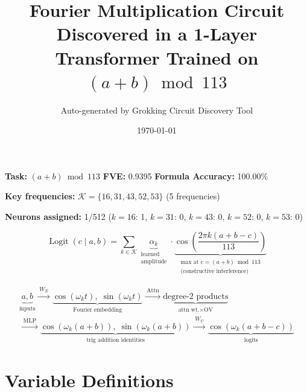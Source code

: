 \documentclass[11pt,a4paper]{article}
\title{Fourier Multiplication Circuit\\[6pt]
\large Discovered in a 1-Layer Transformer Trained on $(a + b) \bmod 113$}
\author{Auto-generated by Grokking Circuit Discovery Tool}
\date{\today}
\newcommand{\MLP}{\operatorname{MLP}}
\newcommand{\attn}{\operatorname{Attn}}
\newcommand{\Logit}{\operatorname{Logit}}
\begin{document}
\maketitle

\begin{tcolorbox}[colback=blue!5!white, colframe=blue!75!black, title=Circuit Summary]
  \textbf{Task:} $(a + b) \bmod 113$ \hfill
  \textbf{FVE:} 0.9395 \hfill
  \textbf{Formula Accuracy:} 100.00\%

  \textbf{Key frequencies:} $\mathcal{K} = \{16, 31, 43, 52, 53\}$
  \quad (5 frequencies)

  \textbf{Neurons assigned:} 1/512
  \quad ($k=16$: 1, $k=31$: 0, $k=43$: 0, $k=52$: 0, $k=53$: 0)
\end{tcolorbox}

\begin{tcolorbox}[colback=green!5!white, colframe=green!75!black, title=The Core Equation]
  \begin{equation}
    \boxed{
      \Logit(c \mid a, b) =
      \sum_{k \in \mathcal{K}}
      \underbrace{\alpha_k}_{\substack{\text{learned} \\ \text{amplitude}}}
      \cdot \underbrace{\cos\!\left(\frac{2\pi k (a + b - c)}{113}\right)}_{\substack{\text{max at } c = (a+b) \bmod 113 \\ \text{(constructive interference)}}}
    }
  \end{equation}
\end{tcolorbox}

\begin{tcolorbox}[colback=orange!5!white, colframe=orange!75!black, title=Data Flow Pipeline]
  \begin{gather*}
    \underbrace{a, b}_{\text{inputs}}
    \xrightarrow{\; W_E \;}
    \underbrace{\cos(\omega_k t),\; \sin(\omega_k t)}_{\text{Fourier embedding}}
    \xrightarrow{\; \attn \;}
    \underbrace{\text{degree-2 products}}_{\substack{\text{attn wt.} \times \text{OV}}} \\[8pt]
    \xrightarrow{\; \MLP \;}
    \underbrace{\cos(\omega_k(a{+}b)),\; \sin(\omega_k(a{+}b))}_{\text{trig addition identities}}
    \xrightarrow{\; W_U \;}
    \underbrace{\cos(\omega_k(a{+}b{-}c))}_{\text{logits}}
  \end{gather*}
\end{tcolorbox}

\tableofcontents
\newpage

\section{Variable Definitions}
\end{document}
